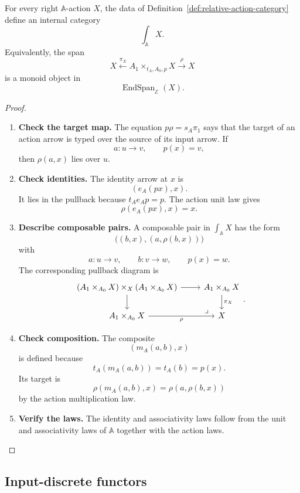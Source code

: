 \begin{theorem}
\label{thm:relative-action-category-internal}
For every right \(\mathbb A\)-action \(X\), the data of
Definition~\ref{def:relative-action-category} define an internal category
\[
\int_{\mathbb A}X.
\]
Equivalently, the span
\[
X
\xleftarrow{\pi_X}
A_1\times_{t_A,A_0,p}X
\xrightarrow{\rho}
X
\]
is a monoid object in
\[
\operatorname{EndSpan}_{\mathcal E}(X).
\]
\end{theorem}

\begin{proof}
\leavevmode
\begin{enumerate}
\item \textbf{Check the target map.}
The equation \(p\rho=s_A\pi_1\) says that the target of an action arrow is
typed over the source of its input arrow. If
\[
a:u\to v,
\qquad
p(x)=v,
\]
then \(\rho(a,x)\) lies over \(u\).

\item \textbf{Check identities.}
The identity arrow at \(x\) is
\[
(e_A(px),x).
\]
It lies in the pullback because \(t_Ae_Ap=p\). The action unit law gives
\[
\rho(e_A(px),x)=x.
\]

\item \textbf{Describe composable pairs.}
A composable pair in \(\int_{\mathbb A}X\) has the form
\[
\bigl((b,x),(a,\rho(b,x))\bigr)
\]
with
\[
a:u\to v,
\qquad
b:v\to w,
\qquad
p(x)=w.
\]
The corresponding pullback diagram is
\[
\begin{tikzcd}
\left(A_1\times_{A_0}X\right)
\times_X
\left(A_1\times_{A_0}X\right)
\arrow[r]
\arrow[d]
&
A_1\times_{A_0}X
\arrow[d,"\pi_X"]
\\
A_1\times_{A_0}X
\arrow[r,"\rho"']
&
X
\arrow[ul,phantom,very near start,"\lrcorner"]
\end{tikzcd}
.
\]

\item \textbf{Check composition.}
The composite
\[
(m_A(a,b),x)
\]
is defined because
\[
t_A(m_A(a,b))=t_A(b)=p(x).
\]
Its target is
\[
\rho(m_A(a,b),x)=\rho(a,\rho(b,x))
\]
by the action multiplication law.

\item \textbf{Verify the laws.}
The identity and associativity laws follow from the unit and associativity
laws of \(\mathbb A\) together with the action laws.
\end{enumerate}
\end{proof}

\subsection{Input-discrete functors}
\label{subsec:relative-input-discrete-functors}

